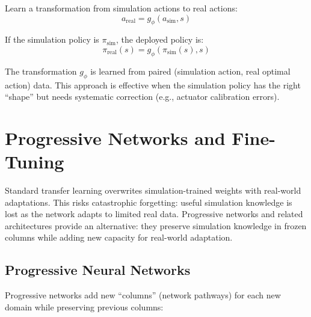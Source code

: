 Learn a transformation from simulation actions to real actions:
\begin{equation}
a_{\text{real}} = g_\phi(a_{\text{sim}}, s)
\label{eq:action_transform}
\end{equation}

If the simulation policy is $\pi_{\text{sim}}$, the deployed policy is:
\begin{equation}
\pi_{\text{real}}(s) = g_\phi(\pi_{\text{sim}}(s), s)
\end{equation}

The transformation $g_\phi$ is learned from paired (simulation action, real optimal action) data. This approach is effective when the simulation policy has the right ``shape'' but needs systematic correction (e.g., actuator calibration errors).

\section{Progressive Networks and Fine-Tuning}
\label{sec:progressive_networks}

Standard transfer learning overwrites simulation-trained weights with real-world adaptations. This risks catastrophic forgetting: useful simulation knowledge is lost as the network adapts to limited real data. Progressive networks and related architectures provide an alternative: they preserve simulation knowledge in frozen columns while adding new capacity for real-world adaptation.

\subsection{Progressive Neural Networks}

Progressive networks add new ``columns'' (network pathways) for each new domain while preserving previous columns:

